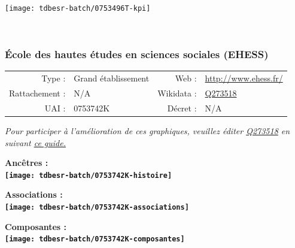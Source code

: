 \documentclass[12pt,french,]{article}
\begin{document}
\begin{center}\texttt{[image: tdbesr-batch/0753496T-kpi]} \end{center}\checkoddpage

\ifoddpage \fi ~\newpage  

\hypertarget{uxe9cole-des-hautes-uxe9tudes-en-sciences-sociales-ehess}{%
\subsubsection{École des hautes études en sciences sociales
(EHESS)}\label{uxe9cole-des-hautes-uxe9tudes-en-sciences-sociales-ehess}}

\begin{tabular*}{\textwidth}{rp{5cm}rl}  
\hline  
Type : & Grand établissement & Web : &\href{http://www.ehess.fr/}{http://www.ehess.fr/} \\  
Rattachement : & N/A & Wikidata : & \href{https://www.wikidata.org/entity/Q273518}{Q273518} \\  
UAI : & 0753742K & Décret : & N/A \\  
\hline  
\end{tabular*}

\textit{\scriptsize Pour participer à l'amélioration de ces graphiques, veuillez éditer  \href{https://www.wikidata.org/entity/Q273518}{Q273518}  en suivant \href{https://github.com/cpesr/wikidataESR/blob/master/Rmd/wikidataESR.md}{ce guide.}}

\vspace{1cm}  
\begin{minipage}[b]{0.50\textwidth}\begin{center} \bf Ancêtres : \\  
\texttt{[image: tdbesr-batch/0753742K-histoire]} \end{center}\end{minipage}\begin{minipage}[b]{0.50\textwidth}\begin{center} \bf Associations : \\  
\texttt{[image: tdbesr-batch/0753742K-associations]} \end{center}\end{minipage}

\hrulefill

\begin{center} \bf Composantes : \\  
\texttt{[image: tdbesr-batch/0753742K-composantes]} \end{center}
\end{document}

